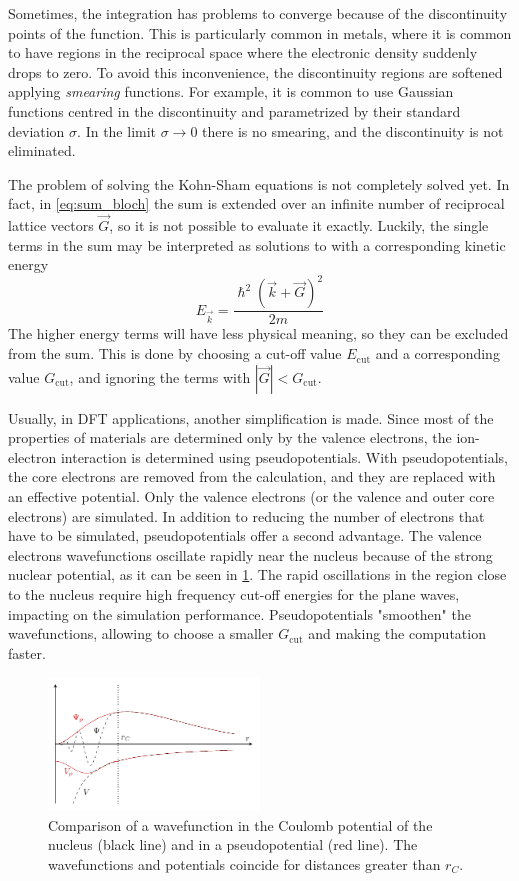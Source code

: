 Sometimes, the integration has problems to converge because of the discontinuity points of the function. This is particularly common in metals, where it is common to have regions in the reciprocal space where the electronic density suddenly drops to zero. To avoid this inconvenience, the discontinuity regions are softened applying \emph{smearing} functions. For example, it is common to use Gaussian functions centred in the discontinuity and parametrized by their standard deviation $\sigma$. In the limit $\sigma \rightarrow 0$ there is no smearing, and the discontinuity is not eliminated.

The problem of solving the Kohn-Sham equations is not completely solved yet. In fact, in \cref{eq:sum_bloch} the sum is extended over an infinite number of reciprocal lattice vectors $\vec{G}$, so it is not possible to evaluate it exactly. Luckily, the single terms in the sum may be interpreted as solutions to \sches with a corresponding kinetic energy
\begin{equation}
    E_\vec{k} = \frac{\hslash^2(\vec{k}+\vec{G})^2}{2m}
\end{equation}
The higher energy terms will have less physical meaning, so they can be excluded from the sum. This is done by choosing a cut-off value $E_\text{cut}$ and a corresponding value $G_\text{cut}$, and ignoring the terms with $|\vec{G}| < G_\text{cut}$.

Usually, in DFT applications, another simplification is made. Since most of the properties of materials are determined only by the valence electrons, the ion-electron interaction is determined using pseudopotentials. With pseudopotentials, the core electrons are removed from the calculation, and they are replaced with an effective potential. Only the valence electrons (or the valence and outer core electrons) are simulated. In addition to reducing the number of electrons that have to be simulated, pseudopotentials offer a second advantage. The valence electrons wavefunctions oscillate rapidly near the nucleus because of the strong nuclear potential, as it can be seen in \cref{fig:pseudopotential}. The rapid oscillations in the region close to the nucleus require high frequency cut-off energies for the plane waves, impacting on the simulation performance. Pseudopotentials "smoothen" the wavefunctions, allowing to choose a smaller $G_\text{cut}$ and making the computation faster.

\begin{figure}
    \centering
    \includegraphics[width=0.5\textwidth]{figures/pseudopotential/pseudopotential.pdf}
    \caption[Pseudopotentials]{Comparison of a wavefunction in the Coulomb potential of the nucleus (black line) and in a pseudopotential (red line). The wavefunctions and potentials coincide for distances greater than $r_C$.}
    \label{fig:pseudopotential}
\end{figure}
